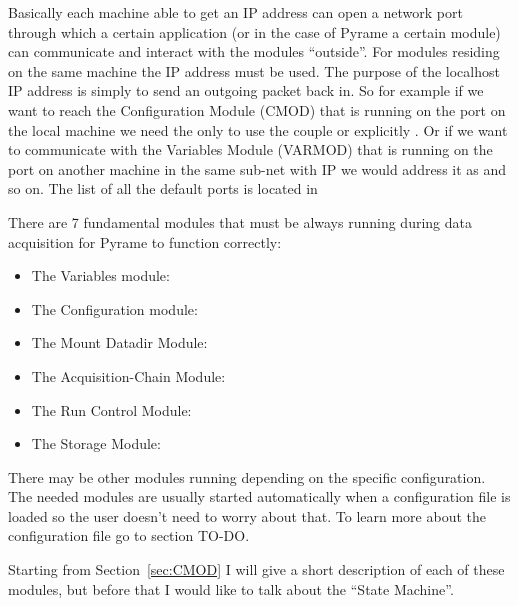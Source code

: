 Basically each machine able to get an IP address can open a network
port through which a certain application (or in the case of Pyrame a
certain module) can communicate and interact with the modules
``outside''. For modules residing on the same machine the
 IP address must be used. The purpose
of the localhost IP address is simply to send an outgoing packet back
in. So for example if we want to reach the Configuration Module (CMOD)
that is running on the port  on the local
machine we need the only to use the couple
 or explicitly
. Or if we want to communicate with the
Variables Module (VARMOD) that is running on the port
 on another machine in the same sub-net
with IP  we would address it as
 and so on.  The list of all the
default ports is located in 

There are 7 fundamental modules that must be always running during
data acquisition for Pyrame to function correctly:
\begin{itemize}
\item The Variables module: 
\item The Configuration module: 
\item The Mount Datadir Module: 
\item The Acquisition-Chain Module: 
\item The Run Control Module: 
\item The Storage Module: 
\end{itemize}
There may be other modules running depending on the specific
configuration. The needed modules are usually started automatically
when a configuration file is loaded so the user doesn't need to worry
about that. To learn more about the configuration file go to section
TO-DO.\@

Starting from Section~\ref{sec:CMOD} I will give a short description
of each of these modules, but before that I would like to talk about
the ``State Machine''.

